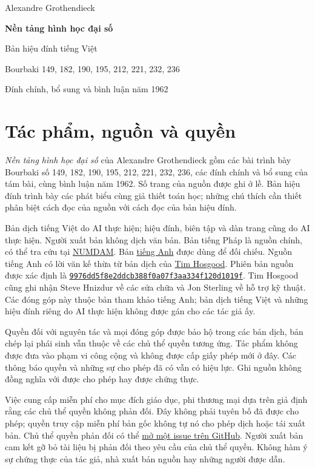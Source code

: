 \documentclass[11pt,twoside,openany]{book}
\numberwithin{equation}{section}
\newcommand{\editiondescription}{Bản hiệu đính trình bày các phát biểu cùng giả thiết toán học; những chú thích cần thiết phân biệt cách đọc của nguồn với cách đọc của bản hiệu đính.}
\begin{document}
\frontmatter
\begin{titlepage}
\centering\vspace*{2cm}
{\Large Alexandre Grothendieck\par}\vspace{1.5cm}
{\Huge\bfseries Nền tảng hình học đại số\par}\vspace{1.2cm}
{\Large Bản hiệu đính tiếng Việt\par}
\vfill
{Bourbaki 149, 182, 190, 195, 212, 221, 232, 236\par}
{Đính chính, bổ sung và bình luận năm 1962\par}
\end{titlepage}
\chapter*{Tác phẩm, nguồn và quyền}
\textit{Nền tảng hình học đại số} của Alexandre Grothendieck gồm các bài trình bày
Bourbaki số 149, 182, 190, 195, 212, 221, 232, 236, các đính chính và bổ sung
của tám bài, cùng bình luận năm 1962. Số trang của nguồn được ghi ở lề.
\editiondescription

Bản dịch tiếng Việt do AI thực hiện; hiệu đính, biên tập và dàn trang cũng do AI
thực hiện. Người xuất bản không dịch văn bản. Bản tiếng Pháp là nguồn chính,
có thể tra cứu tại \href{https://www.numdam.org/}{NUMDAM}. Bản
\href{https://github.com/KokunoYumeto/fga-en}{tiếng Anh} được dùng để đối chiếu.
Nguồn tiếng Anh có lời văn kế thừa từ bản dịch của \href{https://github.com/thosgood/fga}{Tim Hosgood}.
Phiên bản nguồn được xác định là
\href{https://github.com/thosgood/fga/tree/9976dd5f8e2ddcb388f0a07f3aa334f120d1019f}{\nolinkurl{9976dd5f8e2ddcb388f0a07f3aa334f120d1019f}}.
Tim Hosgood cũng ghi nhận Steve Hnizdur về các sửa chữa và Jon Sterling về hỗ trợ kỹ thuật.
Các đóng góp này thuộc bản tham khảo tiếng Anh; bản dịch tiếng Việt và những
hiệu đính riêng do AI thực hiện không được gán cho các tác giả ấy.

Quyền đối với nguyên tác và mọi đóng góp được bảo hộ trong các bản dịch, bản
chép lại phái sinh vẫn thuộc về các chủ thể quyền tương ứng. Tác phẩm không được
đưa vào phạm vi công cộng và không được cấp giấy phép mới ở đây. Các thông báo
quyền và những sự cho phép đã có vẫn có hiệu lực. Ghi nguồn không đồng nghĩa với
được cho phép hay được chứng thực.

Việc cung cấp miễn phí cho mục đích giáo dục, phi thương mại dựa trên giả định
rằng các chủ thể quyền không phản đối. Đây không phải tuyên bố đã được cho phép;
quyền truy cập miễn phí bản gốc không tự nó cho phép dịch hoặc tái xuất bản.
Chủ thể quyền phản đối có thể \href{https://github.com/KokunoYumeto/ega-fga-sga-vi/issues}{mở một issue trên GitHub}.
Người xuất bản cam kết gỡ bỏ tài liệu bị phản đối theo yêu cầu của chủ thể quyền.
Không hàm ý sự chứng thực của tác giả, nhà xuất bản nguồn hay những người được dẫn.
\clearpage
\end{document}
